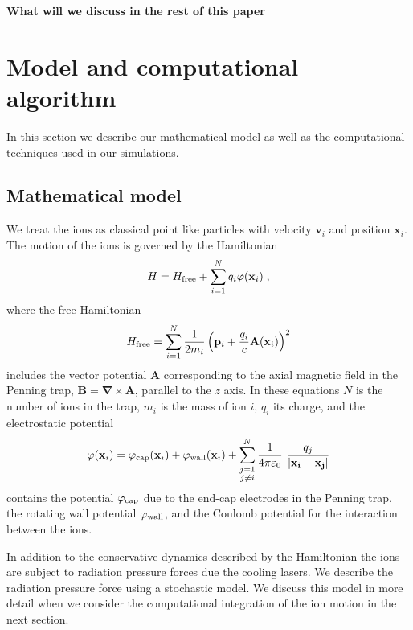 \documentclass[aps, pra, preprint]{revtex4-1}
\newcommand{\hfree}{H_{\rm free}}
\newcommand{\phicap}{\varphi_{\rm cap}}
\newcommand{\phiwall}{\varphi_{\rm wall}}
\begin{document}
{\bf What will we discuss in the rest of this paper}


\section{Model and computational algorithm}

In this section we describe our mathematical model as well as the
computational techniques used in our simulations.


\subsection{Mathematical model}

We treat the ions as classical point like particles with 
velocity $\mathbf{v}_i$ and position $\mathbf{x}_i$. The motion
of the ions is governed by the Hamiltonian
\begin{equation}
  H = \hfree + \sum_{i=1}^N q_i\varphi(\mathbf{x}_i)\;,
\end{equation}
where the free Hamiltonian
\begin{equation}
  \hfree =
  \sum_{i=1}^N \frac{1}{2m_i}\left(
    \mathbf{p}_i +
    \frac{q_i}{c}\mathbf{A}(\mathbf{x}_i) \right)^2 
\end{equation}
includes the vector potential $\mathbf{A}$ corresponding to the
axial magnetic field in the Penning trap, $\mathbf{B} =
\mathbf{\nabla}\times \mathbf{A}$, parallel to the $z$ axis. In
these equations $N$ is the number of ions in the trap, $m_i$ is
the mass of ion $i$, $q_i$ its charge, and the electrostatic
potential
\begin{equation}
  \varphi(\mathbf{x}_i) =
  \phicap(\mathbf{x}_i) +
  \phiwall(\mathbf{x}_i) +
  \sum_{\substack{j=1\\j\neq i}}^N
  \frac{1}{4\pi\varepsilon_0}\
  \frac{q_j}{\left| \mathbf{x_i} - \mathbf{x_j} \right|}
\end{equation}
contains the potential $\phicap$ due to the end-cap electrodes in
the Penning trap, the rotating wall potential $\phiwall$, and the
Coulomb potential for the interaction between the ions.

In addition to the conservative dynamics described by the
Hamiltonian the ions are subject to radiation pressure forces due
the cooling lasers. We describe the radiation pressure force
using a stochastic model. We discuss this model in more detail
when we consider the computational integration of the ion motion
in the next section.
\end{document}

